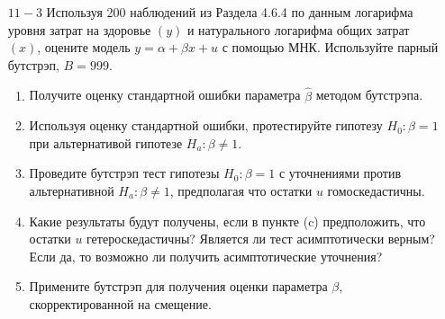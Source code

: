 \begin{enumerate}
\item [$11 - 3$] Используя 200 наблюдений из Раздела 4.6.4 по данным логарифма уровня затрат на здоровье $(y)$ и натурального логарифма общих затрат $(x)$, оцените модель $y=\alpha+\beta x +u$ с помощью МНК. Используйте парный бутстрэп, $B=999$.
\begin{enumerate}
\item Получите оценку стандартной ошибки параметра $\hat{\beta}$ методом бутстрэпа.
\item Используя оценку стандартной ошибки, протестируйте гипотезу $H_0:\beta=1$ при альтернативой гипотезе $H_a:\beta \neq 1$.
\item Проведите  бутстрэп тест гипотезы $H_0:\beta=1$ с уточнениями  против альтернативной $H_a:\beta \neq 1$, предполагая что остатки $u$ гомоскедастичны.
\item Какие результаты будут получены, если в пункте (c) предположить, что остатки $u$ гетероскедастичны? Является ли тест асимптотически верным? Если да, то возможно ли получить асимптотические уточнения?
\item Примените бутстрэп для получения оценки параметра $\beta$, скорректированной на смещение.
\end{enumerate}
\end{enumerate}

